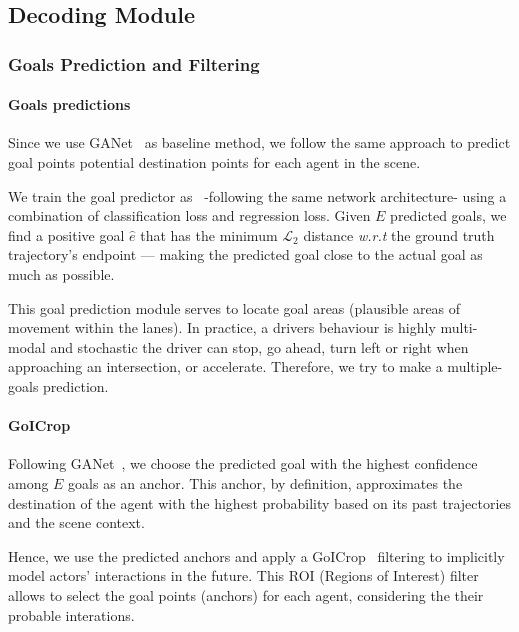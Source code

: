 \subsection{Decoding Module}

\subsubsection{Goals Prediction and Filtering}

\paragraph{Goals predictions}

Since we use GANet~\cite{wang2022ganet} as baseline method, we follow the same approach to predict goal points \ie potential destination points for each agent in the scene.

We train the goal predictor as~\cite{wang2022ganet} -following the same network architecture- using a combination of classification loss and regression loss. Given $E$ predicted goals, we find a positive goal $\hat{e}$ that has the minimum $\mathcal{L}_2$ distance \emph{w.r.t} the ground truth trajectory's endpoint --- making the predicted goal close to the actual goal as much as possible.

This goal prediction module serves to locate goal areas (\eg plausible areas of movement within the lanes). In practice, a drivers behaviour is highly multi-modal and stochastic \eg the driver can stop, go ahead, turn left or right when approaching an intersection, or accelerate. Therefore, we try to make a multiple-goals prediction. 

\paragraph{GoICrop}

Following GANet~\cite{wang2022ganet}, we choose the predicted goal with the highest confidence among $E$ goals as an anchor. This anchor, by definition, approximates the destination of the agent with the highest probability based on its past trajectories and the scene context.

Hence, we use the predicted anchors and apply a GoICrop~\cite{wang2022ganet} filtering to implicitly model actors' interactions in the future. This ROI (Regions of Interest) filter allows to select the goal points (anchors) for each agent, considering the their probable interations.

